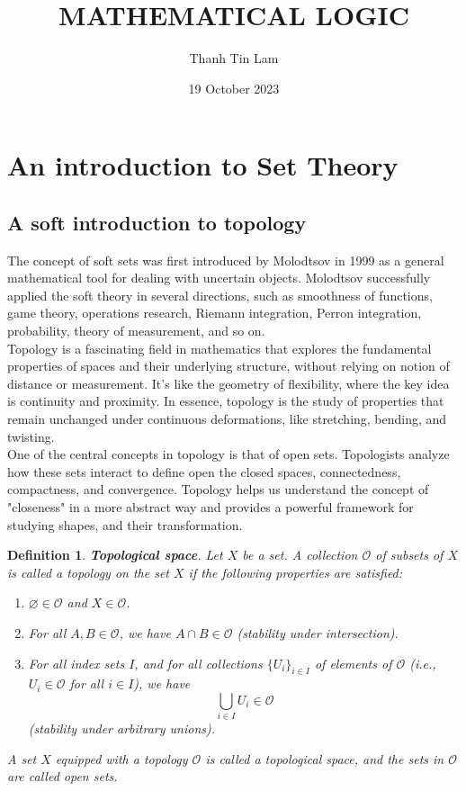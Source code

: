 \documentclass{article}
\title{\textbf{MATHEMATICAL LOGIC}}
\author{ Thanh Tin Lam}
\date{ 19 October 2023}
\newtheorem{definition}{Definition}
\begin{document}
\maketitle
\vspace{2cm}
\section{An introduction to Set Theory}
    \subsection{A soft introduction to topology}
    \hspace{8mm} The concept of soft sets was first introduced by Molodtsov in 1999 as a general mathematical tool for dealing with uncertain objects. Molodtsov successfully applied the soft theory in several directions, such as smoothness of functions, game theory, operations research, Riemann integration, Perron integration, probability, theory of measurement, and so on.\\
     
    \hspace{4mm} Topology is a fascinating field in mathematics that explores the fundamental properties of spaces and their underlying structure, without relying on notion of distance or measurement. It's like the geometry of flexibility, where the key idea is continuity and proximity. In essence, topology is the study of properties that remain unchanged under continuous deformations, like stretching, bending, and twisting.\\
     
    \hspace{4mm} One of the central concepts in topology is that of open sets. Topologists analyze how these sets interact to define open the closed spaces, connectedness, compactness, and convergence. Topology helps us understand the concept of "closeness" in a more abstract way and provides a powerful framework for studying shapes, and their transformation.
    

\begin{definition}
\textbf{Topological space}. Let $X$ be a set. A collection $\mathcal{O}$ of subsets of $X$ is called a topology on the set $X$ if the following properties are satisfied:
\begin{enumerate}
  \item[($\tau_1$)] $\varnothing \in \mathcal{O}$ and $X \in \mathcal{O}$.
  \item[($\tau_2$)] For all $A, B \in \mathcal{O}$, we have $A \cap B \in \mathcal{O}$ (stability under intersection).
  \item[($\tau_3$)] For all index sets $I$, and for all collections $\{U_i\}_{i\in I}$ of elements of $\mathcal{O}$ (i.e., $U_i \in \mathcal{O}$ for all $i \in I$), we have
    \[
    \bigcup_{i\in I} U_i \in \mathcal{O}
    \]
    (stability under arbitrary unions).
\end{enumerate}
A set $X$ equipped with a topology $\mathcal{O}$ is called a topological space, and the sets in $\mathcal{O}$ are called open sets.
\end{definition}
\end{document}
